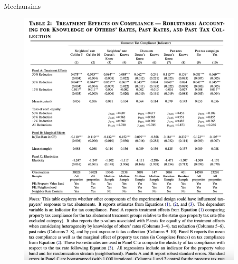 \documentclass{beamer}
\begin{document}
\begin{frame}{Mechansims}
\begin{figure}
    \centering
    \includegraphics[height=\textheight,width=\textwidth]{Paper Presentations/The State Capacity Ceiling on Tax Rates/T2.png}
    \label{fig:enter-label}
\end{figure}
\end{frame}
\end{document}
